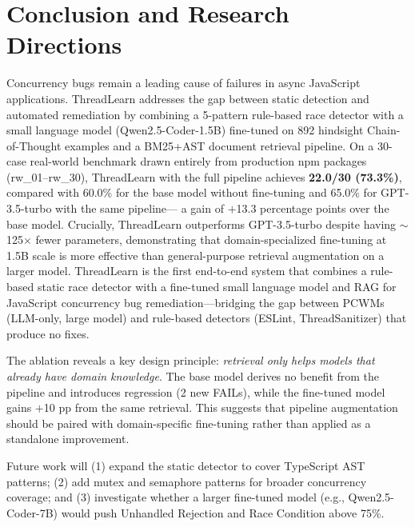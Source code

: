 \documentclass[runningheads]{llncs}
\begin{document}
\section{Conclusion and Research Directions}
\label{sec:conclusion}

Concurrency bugs remain a leading cause of failures in async JavaScript
applications.
ThreadLearn addresses the gap between static detection and automated
remediation by combining a 5-pattern rule-based race detector with a
small language model (Qwen2.5-Coder-1.5B) fine-tuned on 892 hindsight
Chain-of-Thought examples and a BM25+AST document retrieval pipeline.
On a 30-case real-world benchmark drawn entirely from production npm
packages (rw\_01--rw\_30), ThreadLearn with the full pipeline achieves
\textbf{22.0/30 (73.3\%)}, compared with 60.0\% for the base model
without fine-tuning and 65.0\% for GPT-3.5-turbo with the same pipeline---
a gain of $+$13.3 percentage points over the base model.
Crucially, ThreadLearn outperforms GPT-3.5-turbo despite having $\sim$125$\times$
fewer parameters, demonstrating that domain-specialized fine-tuning at
1.5B scale is more effective than general-purpose retrieval augmentation
on a larger model.
ThreadLearn is the first end-to-end system that combines a rule-based
static race detector with a fine-tuned small language model and RAG for
JavaScript concurrency bug remediation---bridging the gap between
PCWMs~\cite{pcwms2026} (LLM-only, large model) and rule-based detectors
(ESLint, ThreadSanitizer) that produce no fixes.

The ablation reveals a key design principle: \emph{retrieval only helps
models that already have domain knowledge}.
The base model derives no benefit from the pipeline and introduces regression
(2 new FAILs), while the fine-tuned model gains $+$10 pp from the same
retrieval.
This suggests that pipeline augmentation should be paired with
domain-specific fine-tuning rather than applied as a standalone improvement.

Future work will (1) expand the static detector to cover TypeScript AST
patterns; (2) add mutex and semaphore patterns for broader concurrency
coverage; and (3) investigate whether a larger fine-tuned model
(e.g., Qwen2.5-Coder-7B) would push Unhandled Rejection and Race Condition
above 75\%.
\end{document}
